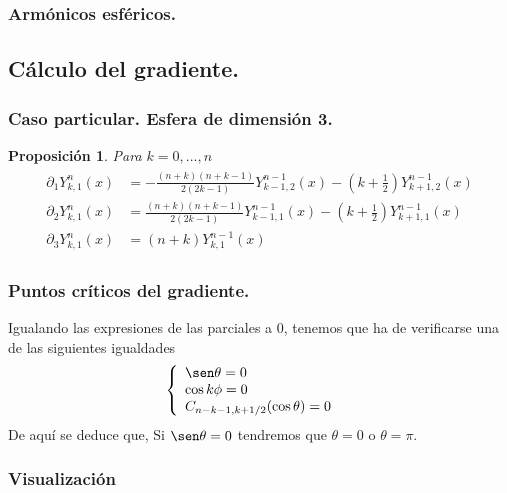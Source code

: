 \documentclass{beamer}
\theoremstyle{plain}
\theoremstyle{definition}
\theoremstyle{plain}
\newtheorem{prop}[thm]{Proposici\'{o}n}
\theoremstyle{definition}
\theoremstyle{remark}
\theoremstyle{definition}
\theoremstyle{lem}
\theoremstyle{cor}
\begin{document}
\begin{frame}
	\frametitle{Armónicos esféricos.}
\end{frame}


\subsection{Cálculo del gradiente.}
\begin{frame}
\end{frame}
\begin{frame}
	\frametitle{Caso particular. Esfera de dimensión 3.}
	\begin{prop} Para $k=0,...,n$
		\begin{gather*} 
		\begin{aligned}
		\partial_1Y^{n}_{k,1}(x) &= -\frac{(n+k)(n+k-1)}{2(2k-1)}Y^{n-1}_{k-1,2}(x)-(k+\frac{1}{2})Y^{n-1}_ {k+1,2}(x) \\
		\partial_2Y^{n}_{k,1}(x) &= \frac{(n+k)(n+k-1)}{2(2k-1)}Y^{n-1}_{k-1,1}(x)-(k+\frac{1}{2})Y^{n-1}_ {k+1,1}(x) \\
		\partial_3 Y_{k,1}^{n}(x) &=(n+k)Y_{k,1}^{n-1}(x)
		\end{aligned}
		\end{gather*}
	\end{prop}
\end{frame}
\begin{frame}
	\frametitle{Puntos críticos del gradiente.}
	Igualando las expresiones de las parciales a 0, tenemos que ha de verificarse una de las siguientes igualdades
	\begin{gather*}
	\left\{
	\begin{array}{ll}
	\sen \theta= 0 \\
	\cos k\phi = 0 &\\
	C_{n-k-1,k+1/2}(\cos \theta) = 0
	\end{array}
	\right.
	\end{gather*}
	De aquí se deduce que,
	Si $\sen \theta = 0$ tendremos que $\theta=0$ o $\theta=\pi$.
\end{frame}
\begin{frame}
	\frametitle{Visualización}
\end{frame}
\end{document}
